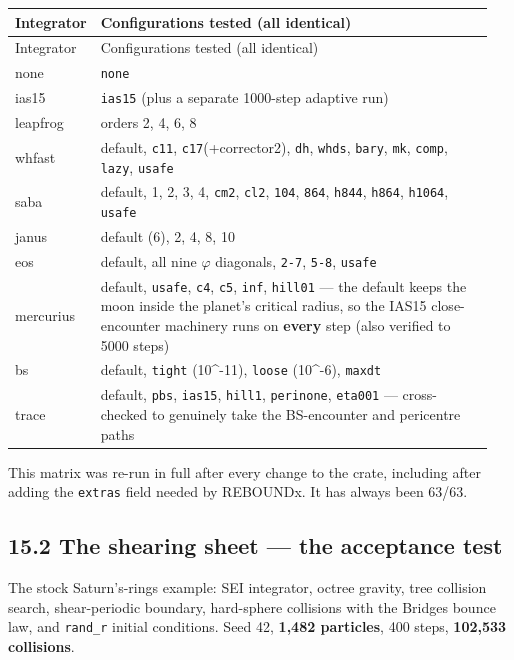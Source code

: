 \documentclass[11pt]{article}
\begin{document}
\begin{longtable}{L{0.094\linewidth}L{0.856\linewidth}}
\toprule
Integrator & Configurations tested (all identical) \\
\midrule
\endfirsthead
\toprule
Integrator & Configurations tested (all identical) \\
\midrule
\endhead
none & \texttt{none} \\
ias15 & \texttt{ias15} (plus a separate 1000-step adaptive run) \\
leapfrog & orders 2, 4, 6, 8 \\
whfast & default, \texttt{c11}, \texttt{c17}(+corrector2), \texttt{dh}, \texttt{whds}, \texttt{bary}, \texttt{mk}, \texttt{comp}, \texttt{lazy}, \texttt{usafe} \\
saba & default, 1, 2, 3, 4, \texttt{cm2}, \texttt{cl2}, \texttt{104}, \texttt{864}, \texttt{h844}, \texttt{h864}, \texttt{h1064}, \texttt{usafe} \\
janus & default (6), 2, 4, 8, 10 \\
eos & default, all nine \(\varphi\) diagonals, \texttt{2-7}, \texttt{5-8}, \texttt{usafe} \\
mercurius & default, \texttt{usafe}, \texttt{c4}, \texttt{c5}, \texttt{inf}, \texttt{hill01} --- the default keeps the moon inside the planet's critical radius, so the IAS15 close-encounter machinery runs on \textbf{every} step (also verified to 5000 steps) \\
bs & default, \texttt{tight} (10\textasciicircum{}-11), \texttt{loose} (10\textasciicircum{}-6), \texttt{maxdt} \\
trace & default, \texttt{pbs}, \texttt{ias15}, \texttt{hill1}, \texttt{perinone}, \texttt{eta001} --- cross-checked to genuinely take the BS-encounter and pericentre paths \\
\bottomrule
\end{longtable}

This matrix was re-run in full after every change to the crate, including after adding the \texttt{extras} field needed by REBOUNDx. It has always been 63/63.

\subsection{15.2 The shearing sheet --- the acceptance test}

The stock Saturn's-rings example: SEI integrator, octree gravity, tree collision search, shear-periodic boundary, hard-sphere collisions with the Bridges bounce law, and \texttt{rand\_r} initial conditions. Seed 42, \textbf{1,482 particles}, 400 steps, \textbf{102,533 collisions}.
\end{document}
